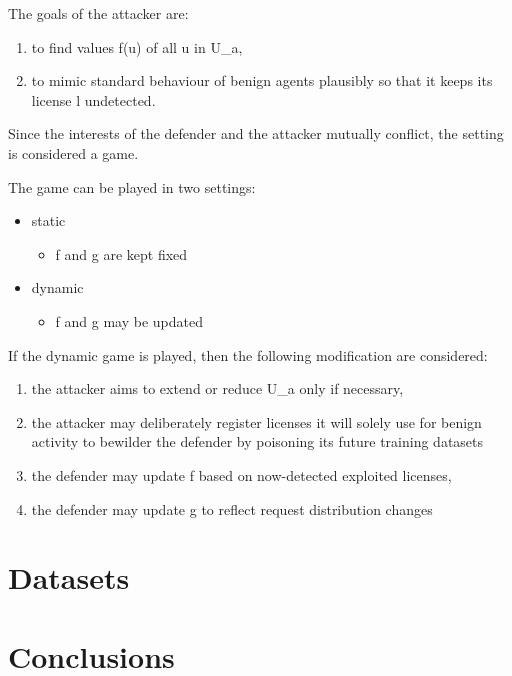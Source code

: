 \documentclass[10pt]{article}
\begin{document}
The goals of the attacker are:

\begin{enumerate}
\def\labelenumi{\arabic{enumi}.}
\item
  to find values f(u) of all u in U\_a,~
\item
  to mimic standard behaviour of benign agents plausibly so that it
  keeps its license l undetected.
\end{enumerate}

Since the interests of the defender and the attacker mutually conflict,
the setting is considered a game.

The game can be played in two settings:

\begin{itemize}
\item
  static

  \begin{itemize}
  \item
    f and g are kept fixed
  \end{itemize}
\item
  dynamic

  \begin{itemize}
  \item
    f and g may be updated
  \end{itemize}
\end{itemize}

If the dynamic game is played, then the following modification are
considered:

\begin{enumerate}
\def\labelenumi{\arabic{enumi}.}
\item
  the attacker aims to extend or reduce U\_a only if necessary,
\item
  the attacker may deliberately register licenses it will solely use for
  benign activity to bewilder the defender by poisoning its future
  training datasets
\item
  the defender may update f based on now-detected exploited licenses,
\item
  the defender may update g to reflect request distribution changes
\end{enumerate}

\section{Datasets}

\section{Conclusions}
\end{document}

